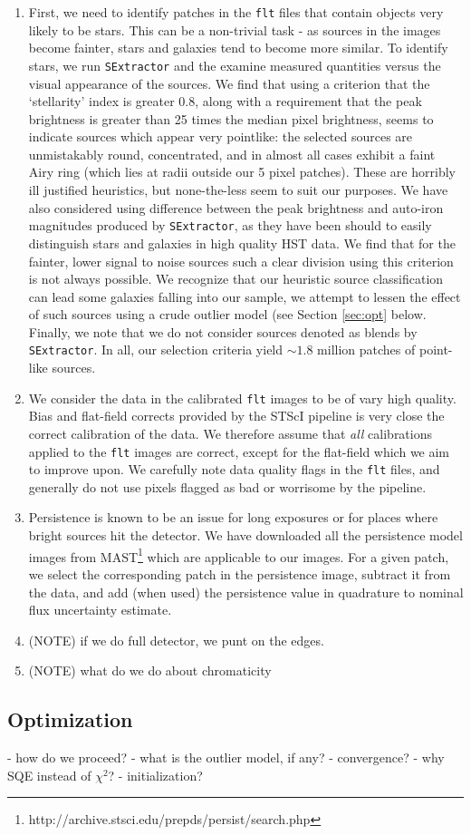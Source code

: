 \documentclass[12pt,preprint,pdftex]{aastex}
\newcommand{\flt}{\texttt{flt}\,\,}
\newcommand{\se}{\texttt{SExtractor}}
\begin{document}
\begin{enumerate}

\item First, we need to identify patches in 
the \flt files that contain objects very likely to be stars.  This can be a non-trivial task - as sources 
in the images become fainter, stars and galaxies tend to become more similar.   To identify stars, 
we run \se \citep{Bertin} and the examine measured quantities versus the visual 
appearance of the sources.  We find that using a criterion that the `stellarity' index is greater 0.8, 
along with a requirement that the peak brightness is greater than 25 times the median pixel 
brightness, seems to indicate sources which appear very pointlike: the selected sources are 
unmistakably round, concentrated, and in almost all cases exhibit a faint Airy ring (which lies at 
radii outside our 5 pixel patches).  These are horribly ill justified heuristics, but none-the-less 
seem to suit our purposes.  We have also considered using difference between the peak 
brightness and auto-iron magnitudes produced by \se, as they have been should to 
easily distinguish stars and galaxies in high quality HST data.  We find that for the fainter, lower 
signal to noise sources such a clear division using this criterion is not always possible.  We 
recognize that our heuristic source classification can lead some galaxies falling into our sample, 
we attempt to lessen the effect of such sources using a crude outlier model (see Section \ref{sec:opt} 
below.  Finally, we note that we do not consider sources denoted as blends by \se.  In all, our 
selection criteria yield $\sim1.8$ million patches of point-like sources.

\item We consider the data in the calibrated \flt images to be of vary high quality.  Bias and flat-field 
corrects provided by the STScI pipeline is very close the correct calibration of the data.  We 
therefore assume that \emph{all} calibrations applied to the \flt images are correct, except for the 
flat-field which we aim to improve upon.  We carefully note data quality flags in the \flt files, and 
generally do not use pixels flagged as bad or worrisome by the pipeline.  

\item Persistence is known to be an issue for long exposures or for places where bright sources 
hit the detector.  We have downloaded all the persistence model images from 
MAST\footnote{http://archive.stsci.edu/prepds/persist/search.php} which are applicable to our 
images.  For a given patch, we select the corresponding patch in the persistence image, subtract 
it from the data, and add (when used) the persistence value in quadrature to nominal flux 
uncertainty estimate.

\item (NOTE) if we do full detector, we punt on the edges.
\item (NOTE) what do we do about chromaticity

\end{enumerate}

\subsection{Optimization}

- how do we proceed?
- what is the outlier model, if any?
- convergence?
- why SQE instead of $\chi^2$?
- initialization?
\end{document}
